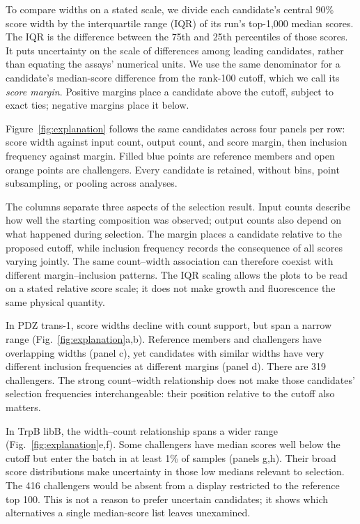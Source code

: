\documentclass[11pt]{article}
\begin{document}
To compare widths on a stated scale, we divide each candidate's
central 90\% score width by the interquartile range (IQR) of its
run's top-1,000 median scores. The IQR is the difference between
the 75th and 25th percentiles of those scores. It puts uncertainty
on the scale of differences among leading candidates, rather than
equating the assays' numerical units. We use the same denominator
for a candidate's median-score difference from the rank-100 cutoff,
which we call its \emph{score margin}. Positive margins place a
candidate above the cutoff, subject to exact ties; negative margins
place it below.

Figure~\ref{fig:explanation} follows the same candidates across
four panels per row: score width against input count, output count,
and score margin, then inclusion frequency against margin. Filled
blue points are reference members and open orange points are
challengers. Every candidate is retained, without bins, point
subsampling, or pooling across analyses.

The columns separate three aspects of the selection result. Input
counts describe how well the starting composition was observed;
output counts also depend on what happened during selection.
The margin places a candidate relative to the proposed cutoff,
while inclusion frequency records the consequence of all scores
varying jointly. The same count--width association can therefore
coexist with different margin--inclusion patterns. The IQR scaling
allows the plots to be read on a stated relative score scale;
it does not make growth and fluorescence the same physical quantity.

In PDZ trans-1, score widths decline with count support, but span a
narrow range (Fig.~\ref{fig:explanation}a,b). Reference members and
challengers have overlapping widths (panel c), yet candidates with
similar widths have very different inclusion frequencies at different
margins (panel d). There are 319 challengers. The strong count--width
relationship does not make those candidates' selection frequencies
interchangeable: their position relative to the cutoff also matters.

In TrpB libB, the width--count relationship spans a wider range
(Fig.~\ref{fig:explanation}e,f). Some challengers have median scores
well below the cutoff but enter the batch in at least 1\% of samples
(panels g,h). Their broad score distributions make uncertainty in
those low medians relevant to selection. The 416 challengers would
be absent from a display restricted to the reference top 100.
This is not a reason to prefer uncertain candidates; it shows
which alternatives a single median-score list leaves unexamined.
\end{document}
